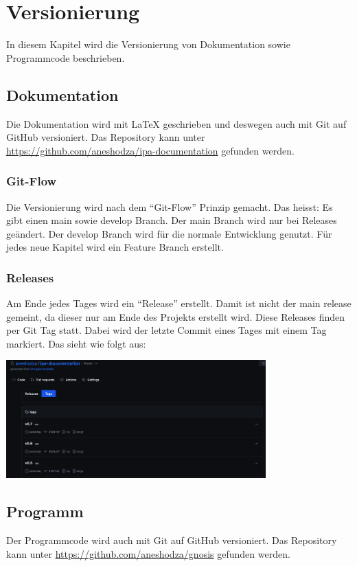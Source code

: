 \section{Versionierung}
\label{sec:versioning}
In diesem Kapitel wird die Versionierung von Dokumentation sowie Programmcode beschrieben.
\subsection{Dokumentation}
Die Dokumentation wird mit LaTeX geschrieben und deswegen auch mit Git auf GitHub versioniert. Das
Repository kann unter \url{https://github.com/aneshodza/ipa-documentation} gefunden werden.
\subsubsection{Git-Flow}
Die Versionierung wird nach dem \enquote{Git-Flow} Prinzip gemacht. Das heisst: Es gibt einen main sowie
develop Branch. Der main Branch wird nur bei Releases geändert. Der develop Branch wird für die normale
Entwicklung genutzt. Für jedes neue Kapitel wird ein Feature Branch erstellt.
\subsubsection{Releases}
Am Ende jedes Tages wird ein \enquote{Release} erstellt. Damit ist nicht der main release gemeint, da dieser
nur am Ende des Projekts erstellt wird. Diese Releases finden per Git Tag statt. Dabei wird der letzte
Commit eines Tages mit einem Tag markiert. Das sieht wie folgt aus:
\begin{center}
    \includegraphics[width=0.75\textwidth]{images/misc/git_tag.png}
    \label{fig:git_tag}
\end{center}

\subsection{Programm}
Der Programmcode wird auch mit Git auf GitHub versioniert. Das Repository kann unter
\url{https://github.com/aneshodza/gnosis} gefunden werden.
